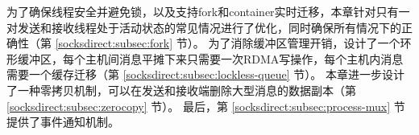 为了确保线程安全并避免锁，以及支持fork和container实时迁移，本章针对只有一对发送和接收线程处于活动状态的常见情况进行了优化，同时确保所有情况下的正确性（第 \ref {socksdirect:subsec:fork} 节）。
为了消除缓冲区管理开销，设计了一个环形缓冲区，每个主机间消息平摊下来只需要一次RDMA写操作，每个主机内消息需要一个缓存迁移（第 \ref {socksdirect:subsec:lockless-queue}  节）。
本章进一步设计了一种零拷贝机制，可以在发送和接收端删除大型消息的数据副本（第 \ref {socksdirect:subsec:zerocopy} 节）。
最后，第 \ref {socksdirect:subsec:process-mux} 节提供了事件通知机制。



